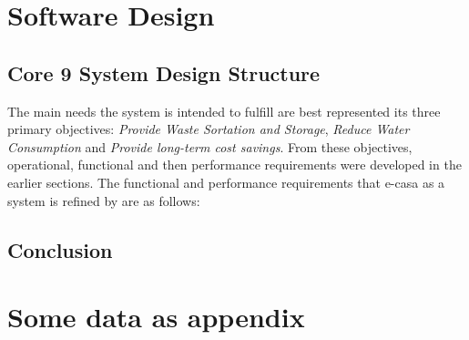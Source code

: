 \documentclass[a4paper,11pt,fleqn]{report}
\begin{document}
\chapter{Software Design}

\section{Core 9 System Design Structure}
The main needs the system is intended to fulfill are best represented its three primary objectives: \textit{Provide Waste Sortation and Storage}, \textit{Reduce Water Consumption} and \textit{Provide long-term cost savings}. From these objectives, operational, functional and then performance requirements were developed in the earlier sections. The functional and performance requirements that \ac{e-casa} as a system is refined by are as follows:

\section{Conclusion}
\acresetall
  


\appendix
\chapter{Some data as appendix}
\end{document}

